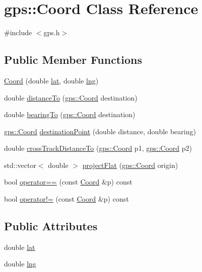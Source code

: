 \hypertarget{classgps_1_1Coord}{}\section{gps\+:\+:Coord Class Reference}
\label{classgps_1_1Coord}


{\ttfamily \#include $<$gps.\+h$>$}

\subsection*{Public Member Functions}
\begin{DoxyCompactItemize}
\item 
\hyperlink{classgps_1_1Coord_afcc45fae837b48cd7d9bd545c4dc574c}{Coord} (double \hyperlink{classgps_1_1Coord_a17cbbd7580a83c42f650b8f93e14d98e}{lat}, double \hyperlink{classgps_1_1Coord_abca98aaabe2dc3cf50ebdd687c2f47e8}{lng})
\item 
double \hyperlink{classgps_1_1Coord_a335589710eec94e6062323ef5c8994ab}{distance\+To} (\hyperlink{classgps_1_1Coord}{gps\+::\+Coord} destination)
\item 
double \hyperlink{classgps_1_1Coord_a3d3d160c28334979d220dce4112e087d}{bearing\+To} (\hyperlink{classgps_1_1Coord}{gps\+::\+Coord} destination)
\item 
\hyperlink{classgps_1_1Coord}{gps\+::\+Coord} \hyperlink{classgps_1_1Coord_ae76a605c81049d648d4e39ee0f56ff7b}{destination\+Point} (double distance, double bearing)
\item 
double \hyperlink{classgps_1_1Coord_a0efb59b2c1fa68551f118bcea3733593}{cross\+Track\+Distance\+To} (\hyperlink{classgps_1_1Coord}{gps\+::\+Coord} p1, \hyperlink{classgps_1_1Coord}{gps\+::\+Coord} p2)
\item 
std\+::vector$<$ double $>$ \hyperlink{classgps_1_1Coord_ac2e47c5d6d9a3d54a4086e8003fc7e9a}{project\+Flat} (\hyperlink{classgps_1_1Coord}{gps\+::\+Coord} origin)
\item 
bool \hyperlink{classgps_1_1Coord_a6e0f9d8bff57711675b435ca75fc6183}{operator==} (const \hyperlink{classgps_1_1Coord}{Coord} \&p) const 
\item 
bool \hyperlink{classgps_1_1Coord_ac472964776941984f42d1dad1160eae6}{operator!=} (const \hyperlink{classgps_1_1Coord}{Coord} \&p) const 
\end{DoxyCompactItemize}
\subsection*{Public Attributes}
\begin{DoxyCompactItemize}
\item 
double \hyperlink{classgps_1_1Coord_a17cbbd7580a83c42f650b8f93e14d98e}{lat}
\item 
double \hyperlink{classgps_1_1Coord_abca98aaabe2dc3cf50ebdd687c2f47e8}{lng}
\end{DoxyCompactItemize}


